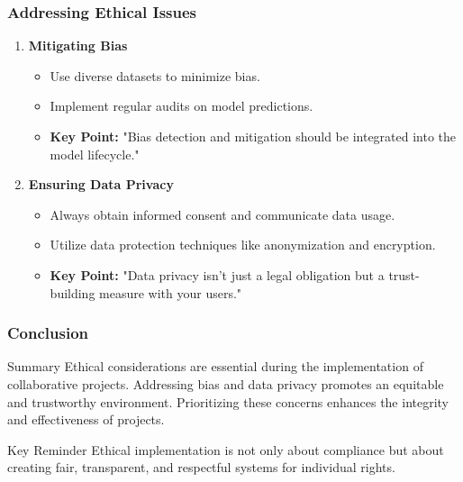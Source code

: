 \documentclass[aspectratio=169]{beamer}
\begin{document}
\begin{frame}[fragile]
    \frametitle{Addressing Ethical Issues}
    \begin{enumerate}
        \item \textbf{Mitigating Bias}
        \begin{itemize}
            \item Use diverse datasets to minimize bias.
            \item Implement regular audits on model predictions.
            \item \textbf{Key Point:} "Bias detection and mitigation should be integrated into the model lifecycle."
        \end{itemize}

        \item \textbf{Ensuring Data Privacy}
        \begin{itemize}
            \item Always obtain informed consent and communicate data usage.
            \item Utilize data protection techniques like anonymization and encryption.
            \item \textbf{Key Point:} "Data privacy isn’t just a legal obligation but a trust-building measure with your users."
        \end{itemize}
    \end{enumerate}
\end{frame}

\begin{frame}[fragile]
    \frametitle{Conclusion}
    \begin{block}{Summary}
        Ethical considerations are essential during the implementation of collaborative projects. Addressing bias and data privacy promotes an equitable and trustworthy environment. Prioritizing these concerns enhances the integrity and effectiveness of projects.
    \end{block}
    
    \begin{block}{Key Reminder}
        Ethical implementation is not only about compliance but about creating fair, transparent, and respectful systems for individual rights.
    \end{block}
\end{frame}
\end{document}

